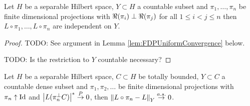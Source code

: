 \begin{lem}\label{lem:OrthogonalProjectionsAndIndependence}Let $H$ be a separable Hilbert space, $Y \subset H$ a countable subset and $\pi_1, \dotsc, \pi_n$ be finite dimensional projections with $\Re(\pi_i) \perp \Re(\pi_j)$ for all $1 \leq i < j \leq n$ then $L \circ \pi_1, \dotsc, L \circ \pi_n$ are independent on $Y$.
\end{lem}
\begin{proof}
TODO: See argument in Lemma \ref{lem:FDPUniformConvergence} below.

TODO: Is the restriction to $Y$ countable necessary?
\end{proof}

\begin{lem}\label{lem:FDPUniformConvergence}Let $H$ be a separable Hilbert space, $C \subset H$ be totally bounded, $Y \subset C$ a countable dense subset and $\pi_1, \pi_2, \dotsc$ be finite dimensional projections with $\pi_n \uparrow \operatorname*{Id}$ and $\left \vert L(\pi_n^\perp C) \right \vert^* \overset{P}\to 0$, then $\left \lVert L \circ \pi_n - L \right \rVert_Y \overset{a.s.}\to 0$.
\end{lem}
